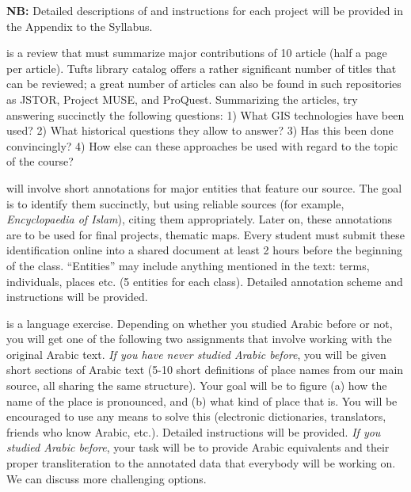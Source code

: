 \documentclass{tufte-handout} %
\begin{document}
\textbf{NB:} Detailed descriptions of and instructions for each project will be provided in the Appendix to the Syllabus.

is a review that must summarize major contributions of 10 article (half a page per article). Tufts library catalog offers a rather significant number of titles that can be reviewed; a great number of articles can also be found in such repositories as JSTOR, Project MUSE, and ProQuest. Summarizing the articles, try answering succinctly the following questions: 1) What GIS technologies have been used? 2) What historical questions they allow to answer? 3) Has this been done convincingly? 4) How else can these approaches be used with regard to the topic of the course?


 will involve short annotations for major entities that feature our source. The goal is to identify them succinctly, but using reliable sources (for example, \textit{Encyclopaedia of Islam}), citing them appropriately. Later on, these annotations are to be used for final projects, thematic maps. Every student must submit these identification online into a shared document at least 2 hours before the beginning of the class. ``Entities'' may include anything mentioned in the text: terms, individuals, places etc. (5 entities for each class). Detailed annotation scheme and instructions will be provided.

 is a language exercise.
Depending on whether you studied Arabic before or not, you will get one of the following two assignments that involve working with the original Arabic text. \textit{If you have never studied Arabic before}, you will be given short sections of Arabic text (5-10 short definitions of place names from our main source, all sharing the same structure). Your goal will be to figure (a) how the name of the place is pronounced, and (b) what kind of place that is. You will be encouraged to use any means to solve this (electronic dictionaries, translators, friends who know Arabic, etc.). Detailed instructions will be provided. \textit{If you studied Arabic before}, your task will be to provide Arabic equivalents and their proper transliteration to the annotated data that everybody will be working on. We can discuss more challenging options.
\end{document}
